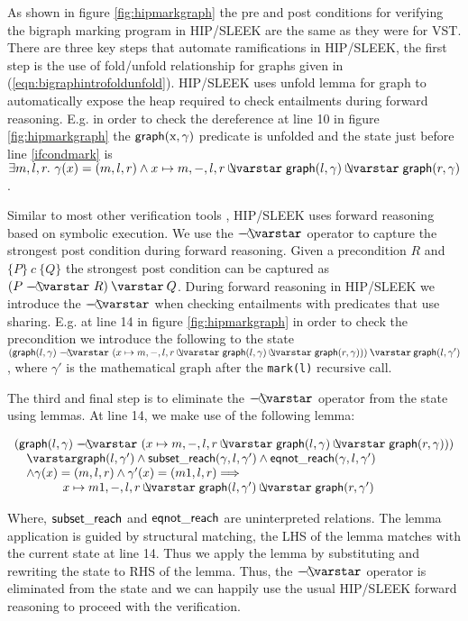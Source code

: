 As shown in figure \ref{fig:hipmarkgraph} the pre and post conditions for verifying the bigraph marking program in HIP/SLEEK are the same as they were for VST. There are three key steps that automate ramifications in HIP/SLEEK, the first step is the use of fold/unfold relationship for graphs given in (\ref{eqn:bigraphintrofoldunfold}). HIP/SLEEK uses unfold lemma for graph to automatically expose the heap required to check entailments during forward reasoning. E.g. in order to check the dereference at line 10 in figure \ref{fig:hipmarkgraph} the $\mathsf{graph}(\text{x},\gamma)$ predicate is unfolded and the state just before line \ref{ifcondmark} is $ \exists m,l,r.~ \gamma(x)=(m,l,r) \wedge x \mapsto m,-,l,r \ocon \p{graph}(l, \gamma) \ocon \p{graph}(r, \gamma)$.

Similar to most other verification tools \cite{Beckert:2007,DistefanoP08,berdine:smallfoot,jacobs:verifast}, HIP/SLEEK uses forward reasoning based on symbolic execution. We use the $\septraction$ operator to capture the strongest post condition during forward reasoning. Given a precondition $R$ and $\{P\}~c~\{Q\}$ the strongest post condition can be captured as $(P \septraction R) \scon Q$. During forward reasoning in HIP/SLEEK we introduce the $\septraction$ when checking entailments with predicates that use sharing. E.g. at line 14 in figure \ref{fig:hipmarkgraph} in order to check the precondition we introduce the following to the state $ (\p{graph}(l, \gamma) \septraction (x \mapsto m,-,l,r \ocon \p{graph}(l, \gamma) \ocon \p{graph}(r, \gamma))) \scon \p{graph}(l, \gamma')$, where $\gamma'$ is the mathematical graph after the \texttt{mark(l)} recursive call.

The third and final step is to eliminate the $\septraction$ operator from the state using lemmas. At line 14, we make use of the following lemma:

\[
\begin{array}{l}
(\p{graph}(l, \gamma) \septraction (x \mapsto m,-,l,r \ocon \p{graph}(l, \gamma) \ocon \p{graph}(r, \gamma))) \\
\quad \scon \p{graph}(l, \gamma') \wedge \p{subset\_reach}(\gamma,l,\gamma') \wedge \p{eqnot\_reach}(\gamma,l,\gamma') \\
\quad \wedge  \gamma(x)=(m,l,r) \wedge \gamma'(x)=(m1,l,r) ==> \\
\qquad \qquad x \mapsto m1,-,l,r \ocon \p{graph}(l, \gamma') \ocon \p{graph}(r, \gamma')
\end{array}
\]

Where, $\mathsf{subset\_reach}$ and $\mathsf{eqnot\_reach}$ are uninterpreted relations. The lemma application is guided by structural matching, the LHS of the lemma matches with the current state at line 14. Thus we apply the lemma by substituting and rewriting the state to RHS of the lemma. Thus, the $\septraction$ operator is eliminated from the state and we can happily use the usual HIP/SLEEK forward reasoning to proceed with the verification.

